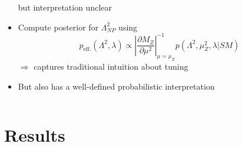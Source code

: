 \documentclass[10pt,aspectratio=169]{beamer}
\begin{document}
\begin{frame}
\begin{columns}[t]
\begin{column}{0.5\textwidth}
\begin{itemize}
        \alert{but interpretation unclear}
      \item Compute posterior for $\Lambda_{NP}^2$ using
        \begin{equation*}
          p_{\text{eff.}}(\Lambda^2, \lambda) \propto
          \left | \frac{\partial M_Z}{\partial \mu^2}
          \right |^{-1}_{\mu = \mu_Z} p(\Lambda^2, \mu_Z^2, \lambda | SM)
        \end{equation*}
      $\Rightarrow$ captures traditional intuition about tuning
      \item {\color{blue} But also has a well-defined probabilistic
        interpretation}
      \end{itemize}
    \end{column}
  \end{columns}
\end{frame}

\section{Results}
\end{document}
